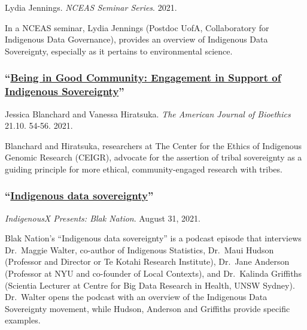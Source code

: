 \documentclass[
]{book}
\begin{document}
Lydia Jennings. \emph{NCEAS Seminar Series}. 2021.

In a NCEAS seminar, Lydia Jennings (Postdoc UofA, Collaboratory for Indigenous Data Governance), provides an overview of Indigenous Data Sovereignty, especially as it pertains to environmental science.

\hypertarget{being-in-good-community-engagement-in-support-of-indigenous-sovereignty}{%
\subsubsection*{\texorpdfstring{``\href{https://www.tandfonline.com/doi/full/10.1080/15265161.2021.1965243}{Being in Good Community: Engagement in Support of Indigenous Sovereignty}''}{``Being in Good Community: Engagement in Support of Indigenous Sovereignty''}}\label{being-in-good-community-engagement-in-support-of-indigenous-sovereignty}}

Jessica Blanchard and Vanessa Hiratsuka. \emph{The American Journal of Bioethics} 21.10. 54-56. 2021.

Blanchard and Hiratsuka, researchers at The Center for the Ethics of Indigenous Genomic Research (CEIGR), advocate for the assertion of tribal sovereignty as a guiding principle for more ethical, community-engaged research with tribes.

\hypertarget{indigenous-data-sovereignty}{%
\subsubsection*{\texorpdfstring{``\href{https://open.spotify.com/episode/3T7XBXU28bghKTPlowEuHL?si=SbeZZ12FQrSC0zbNkt4REA\&nd=1}{Indigenous data sovereignty}''}{``Indigenous data sovereignty''}}\label{indigenous-data-sovereignty}}

\emph{IndigenousX Presents: Blak Nation}. August 31, 2021.

Blak Nation's ``Indigenous data sovereignty'' is a podcast episode that interviews Dr.~Maggie Walter, co-author of Indigenous Statistics, Dr.~Maui Hudson (Professor and Director or Te Kotahi Research Institute), Dr.~Jane Anderson (Professor at NYU and co-founder of Local Contexts), and Dr.~Kalinda Griffiths (Scientia Lecturer at Centre for Big Data Research in Health, UNSW Sydney). Dr.~Walter opens the podcast with an overview of the Indigenous Data Sovereignty movement, while Hudson, Anderson and Griffiths provide specific examples.
\end{document}
